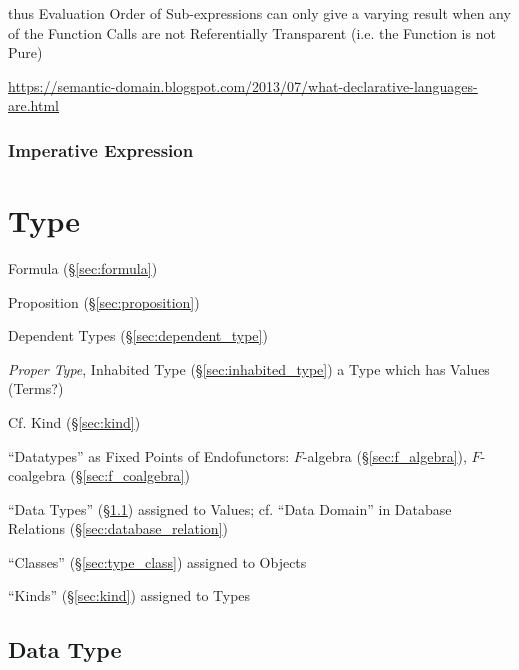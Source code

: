 thus Evaluation Order of Sub-expressions can only give a varying
result when any of the Function Calls are not Referentially
Transparent (i.e. the Function is not Pure)


\url{https://semantic-domain.blogspot.com/2013/07/what-declarative-languages-are.html}



\subsubsection{Imperative Expression}\label{sec:imperative_expression}




\section{Type}\label{sec:type}

Formula (\S\ref{sec:formula})

Proposition (\S\ref{sec:proposition})


Dependent Types (\S\ref{sec:dependent_type})

\emph{Proper Type}, Inhabited Type (\S\ref{sec:inhabited_type}) a Type
which has Values (Terms?)

\fist Cf. Kind (\S\ref{sec:kind})


``Datatypes'' as Fixed Points of Endofunctors: $F$-algebra
(\S\ref{sec:f_algebra}), $F$-coalgebra (\S\ref{sec:f_coalgebra})

``Data Types'' (\S\ref{sec:datatype}) assigned to Values; cf. ``Data Domain''
in Database Relations (\S\ref{sec:database_relation})

``Classes'' (\S\ref{sec:type_class}) assigned to Objects

``Kinds'' (\S\ref{sec:kind}) assigned to Types



\subsection{Data Type}\label{sec:datatype}

